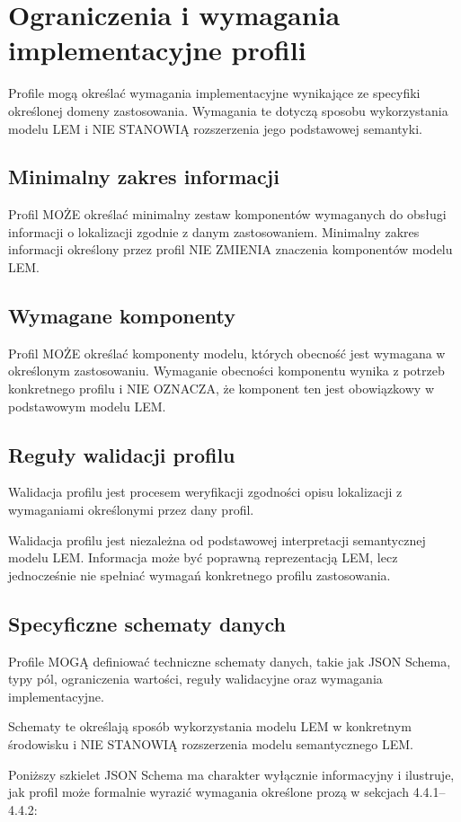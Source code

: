 \section{Ograniczenia i wymagania implementacyjne profili}
Profile mogą określać wymagania implementacyjne wynikające ze specyfiki określonej domeny zastosowania. Wymagania te dotyczą sposobu wykorzystania modelu LEM i NIE STANOWIĄ rozszerzenia jego podstawowej semantyki.

\subsection{Minimalny zakres informacji}
Profil MOŻE określać minimalny zestaw komponentów wymaganych do obsługi informacji o lokalizacji zgodnie z danym zastosowaniem. Minimalny zakres informacji określony przez profil NIE ZMIENIA znaczenia komponentów modelu LEM.

\subsection{Wymagane komponenty}
Profil MOŻE określać komponenty modelu, których obecność jest wymagana w określonym zastosowaniu. Wymaganie obecności komponentu wynika z potrzeb konkretnego profilu i NIE OZNACZA, że komponent ten jest obowiązkowy w podstawowym modelu LEM.

\subsection{Reguły walidacji profilu}
Walidacja profilu jest procesem weryfikacji zgodności opisu lokalizacji z wymaganiami określonymi przez dany profil.

Walidacja profilu jest niezależna od podstawowej interpretacji semantycznej modelu LEM. Informacja może być poprawną reprezentacją LEM, lecz jednocześnie nie spełniać wymagań konkretnego profilu zastosowania.

\subsection{Specyficzne schematy danych}
Profile MOGĄ definiować techniczne schematy danych, takie jak JSON Schema, typy pól, ograniczenia wartości, reguły walidacyjne oraz wymagania implementacyjne.

Schematy te określają sposób wykorzystania modelu LEM w konkretnym środowisku i NIE STANOWIĄ rozszerzenia modelu semantycznego LEM.

Poniższy szkielet JSON Schema ma charakter wyłącznie informacyjny i ilustruje, jak profil może formalnie wyrazić wymagania określone prozą w sekcjach 4.4.1–4.4.2:

